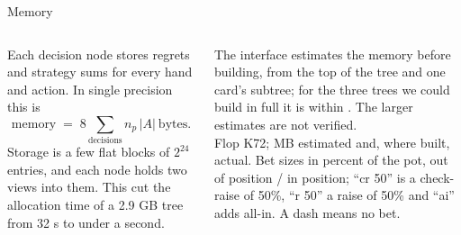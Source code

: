 \documentclass[10pt,aspectratio=169]{beamer}
\begin{document}
\begin{frame}{Memory}
\begin{columns}[T]
\small Each decision node stores regrets and strategy sums for every hand and action. In single precision this is
\[ \text{memory} \;=\; 8 \sum_{\text{decisions}} n_p\,|A| \ \text{bytes}. \]
Storage is a few flat blocks of $2^{24}$ entries, and each node holds two views into them. This cut the allocation
time of a 2.9 GB tree from 32 s to under a second.

\pause
\medskip
The interface estimates the memory before building, from the top of the tree and one card's subtree; for the three
trees we could build in full it is within \MemEstErr. The larger estimates are not verified.
\centering
{\footnotesize\setlength\tabcolsep{2.5pt}}\\[4pt]
{\footnotesize Flop K72; MB estimated and, where built, actual. Bet sizes in percent of the pot, out of position / in position; ``cr 50'' is a check-raise of
50\%, ``r 50'' a raise of 50\% and ``ai'' adds all-in. A dash means no bet.}
\end{columns}
\end{frame}
\end{document}
